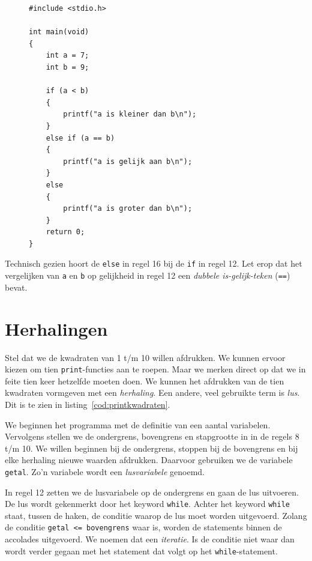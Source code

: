 \begin{figure}[!ht]
\begin{lstlisting}[caption=Afdrukken van tekst op basis van een beslissing.,label=cod:unifelse]
#include <stdio.h>

int main(void)
{
    int a = 7;
    int b = 9;
    
    if (a < b)
    {
        printf("a is kleiner dan b\n");
    }
    else if (a == b) 
    {
        printf("a is gelijk aan b\n");
    }
    else
    {
        printf("a is groter dan b\n");
    }
    return 0;
}
\end{lstlisting}
\end{figure}

Technisch gezien hoort de \texttt{else} in regel 16 bij de \texttt{if} in regel 12. Let erop dat het vergelijken van \texttt{a} en \texttt{b} op gelijkheid in regel 12 een \textsl{dubbele is-gelijk-teken} (\texttt{==})\indexop{==} bevat.

 
\section{Herhalingen}
Stel dat we de kwadraten van 1 t/m 10 willen afdrukken. We kunnen ervoor kiezen om tien \texttt{print}-functies aan te roepen. Maar we merken direct op dat we in feite tien keer hetzelfde moeten doen. We kunnen het afdrukken van de tien kwadraten vormgeven met een \textsl{herhaling}. Een andere, veel gebruikte term is \textsl{lus}. Dit is te zien in listing~\ref{cod:printkwadraten}.


We beginnen het programma met de definitie van een aantal variabelen. Vervolgens stellen we de ondergrens, bovengrens en stapgrootte in in de regels 8 t/m 10. We willen beginnen bij de ondergrens, stoppen bij de bovengrens en bij elke herhaling nieuwe waarden afdrukken. Daarvoor gebruiken we de variabele \texttt{getal}. Zo'n variabele wordt een \textsl{lusvariabele} genoemd.

In regel 12 zetten we de lusvariabele op de ondergrens en gaan de lus uitvoeren. De lus wordt gekenmerkt door het keyword \texttt{while}. Achter het keyword \texttt{while} staat, tussen de haken, de conditie waarop de lus moet worden uitgevoerd.
Zolang de conditie \mbox{\texttt{getal <= bovengrens}} waar is, worden de statements binnen de accolades uitgevoerd. We noemen dat een \textsl{iteratie}. Is de conditie niet waar dan wordt verder gegaan met het statement dat volgt op het \texttt{while}-statement.


